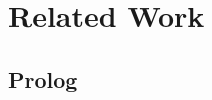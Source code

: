 \documentclass{llncs}
\begin{document}
%
\section{Related Work}
\label{sec:related-work}

\subsection{Prolog}
\end{document}
